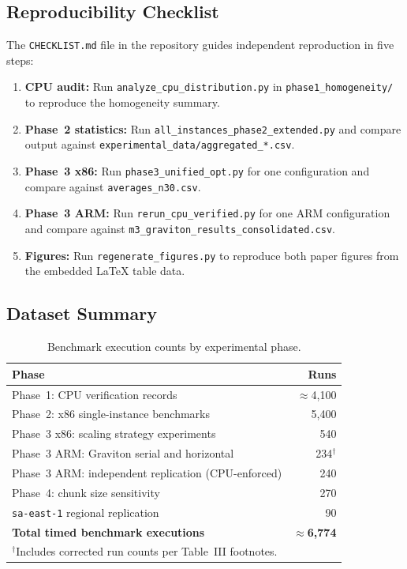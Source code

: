 \documentclass[conference]{IEEEtran}
\begin{document}
\subsection{Reproducibility Checklist}

The \texttt{CHECKLIST.md} file in the repository guides independent
reproduction in five steps:

\begin{enumerate}
  \item \textbf{CPU audit:} Run \texttt{analyze\_cpu\_distribution.py} in
        \texttt{phase1\_homogeneity/} to reproduce the homogeneity summary.
  \item \textbf{Phase~2 statistics:} Run \texttt{all\_instances\_phase2\_extended.py}
        and compare output against \texttt{experimental\_data/aggregated\_*.csv}.
  \item \textbf{Phase~3 x86:} Run \texttt{phase3\_unified\_opt.py} for one
        configuration and compare against \texttt{averages\_n30.csv}.
  \item \textbf{Phase~3 ARM:} Run \texttt{rerun\_cpu\_verified.py} for one ARM
        configuration and compare against
        \texttt{m3\_graviton\_results\_consolidated.csv}.
  \item \textbf{Figures:} Run \texttt{regenerate\_figures.py} to reproduce
        both paper figures from the embedded LaTeX table data.
\end{enumerate}

\subsection{Dataset Summary}

\begin{table}[!htbp]
\centering
\caption{Benchmark execution counts by experimental phase.}
\label{tab:app_dataset}
\small
\begin{tabular}{lr}
\toprule
\textbf{Phase} & \textbf{Runs} \\
\midrule
Phase~1: CPU verification records & $\approx$4,100 \\
Phase~2: x86 single-instance benchmarks & 5,400 \\
Phase~3 x86: scaling strategy experiments & 540 \\
Phase~3 ARM: Graviton serial and horizontal & 234$^{\dagger}$ \\
Phase~3 ARM: independent replication (CPU-enforced) & 240 \\
Phase~4: chunk size sensitivity & 270 \\
\texttt{sa-east-1} regional replication & 90 \\
\midrule
\textbf{Total timed benchmark executions} & $\approx$\textbf{6,774} \\
\bottomrule
\multicolumn{2}{l}{\footnotesize $^{\dagger}$Includes corrected run counts per Table~III footnotes.} \\
\end{tabular}
\end{table}
\end{document}
